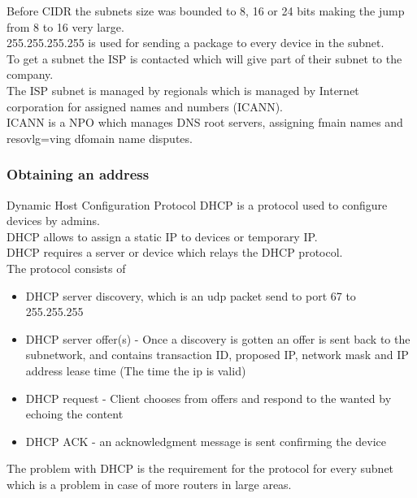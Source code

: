 \documentclass[12pt, a4paper]{article}
\begin{document}
				Before CIDR the subnets size was bounded to 8, 16 or 24 bits making the jump from 8 to 16 very large.\\
				255.255.255.255 is used for sending a package to every device in the subnet.\\
				To get a subnet the ISP is contacted which will give part of their subnet to the company.\\
				The ISP subnet is managed by regionals which is managed by Internet corporation for assigned names and numbers (ICANN).\\
				ICANN is a NPO which manages DNS root servers, assigning fmain names and resovlg=ving dfomain name disputes.\\ 
			\subsubsection{Obtaining an address}
				Dynamic Host Configuration Protocol DHCP is a protocol used to configure devices by admins.\\
				DHCP allows to assign a static IP to devices or temporary IP.\\
				DHCP requires a server or device which relays the DHCP protocol.\\
				The protocol consists of
				\begin{itemize}
					\item DHCP server discovery, which is an udp packet send to port 67 to 255.255.255
					\item DHCP server offer(s) - Once a discovery is gotten an offer is sent back to the subnetwork, and contains transaction ID, proposed IP, network mask and IP address lease time (The time the ip is valid)
					\item DHCP request - Client chooses from offers and respond to the wanted by echoing the content
					\item DHCP ACK - an acknowledgment message is sent confirming the device
				\end{itemize}
				The problem with DHCP is the requirement for the protocol for every subnet which is a problem in case of more routers in large areas.
\end{document}
